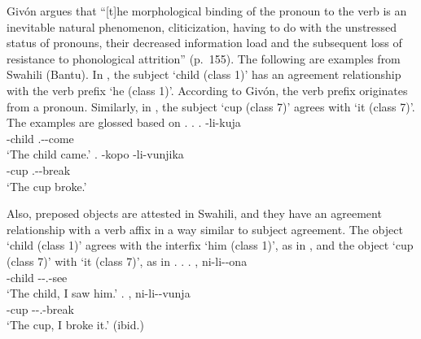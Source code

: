 Giv\'{o}n argues that
``[t]he morphological binding of the pronoun to the verb is an inevitable natural phenomenon, cliticization,
having to do with the unstressed status of pronouns, their decreased information load and the subsequent loss of resistance to phonological attrition'' (p.~155).
The following are examples from Swahili (Bantu).
In \Next[a],
the subject  `child (class 1)' has an agreement relationship with the verb prefix  `he (class 1)'.
According to Giv\'{o}n,
the verb prefix  originates from a pronoun.
Similarly, in \Next[b],
the subject  `cup (class 7)' agrees with  `it (class 7)'.
The examples are glossed based on .
%
\ex.
 \ag.  -li-kuja \\
      -child .--come \\
      `The child came.'
 \bg. -kopo -li-vunjika \\
      -cup .--break \\
      `The cup broke.'
 \hfill{\cite[157]{givon76}}

Also, preposed objects are attested in Swahili,
and they have an agreement relationship with a verb affix in a way similar to subject agreement.
The object  `child (class 1)' agrees with the interfix  `him (class 1)', as in \Next[a], and
the object  `cup (class 7)' with  `it (class 7)', as in \Next[b].
%
\ex.
 \ag. , ni-li--ona \\
      -child --.-see \\
      `The child, I saw him.'
 \bg. , ni-li--vunja \\
      -cup --.-break \\
      `The cup, I broke it.'
      \hfill{(ibid.)}
      
